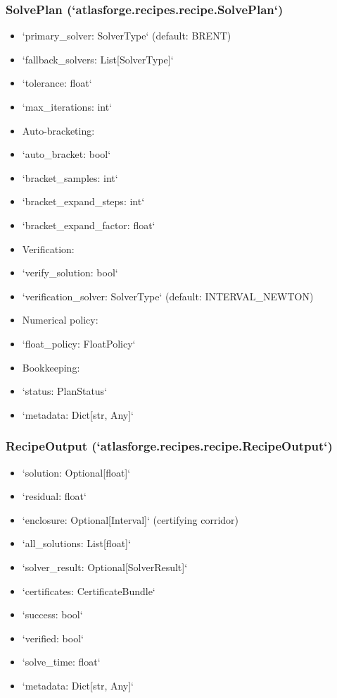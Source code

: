 \documentclass[11pt]{article}
\begin{document}
\subsubsection{SolvePlan (`atlasforge.recipes.recipe.SolvePlan`)}
\begin{itemize}
\item `primary\_solver: SolverType` (default: BRENT)
\item `fallback\_solvers: List[SolverType]`
\item `tolerance: float`
\item `max\_iterations: int`
\item Auto-bracketing:
\item `auto\_bracket: bool`
\item `bracket\_samples: int`
\item `bracket\_expand\_steps: int`
\item `bracket\_expand\_factor: float`
\item Verification:
\item `verify\_solution: bool`
\item `verification\_solver: SolverType` (default: INTERVAL\_NEWTON)
\item Numerical policy:
\item `float\_policy: FloatPolicy`
\item Bookkeeping:
\item `status: PlanStatus`
\item `metadata: Dict[str, Any]`
\end{itemize}

\subsubsection{RecipeOutput (`atlasforge.recipes.recipe.RecipeOutput`)}
\begin{itemize}
\item `solution: Optional[float]`
\item `residual: float`
\item `enclosure: Optional[Interval]` (certifying corridor)
\item `all\_solutions: List[float]`
\item `solver\_result: Optional[SolverResult]`
\item `certificates: CertificateBundle`
\item `success: bool`
\item `verified: bool`
\item `solve\_time: float`
\item `metadata: Dict[str, Any]`
\end{itemize}
\end{document}
